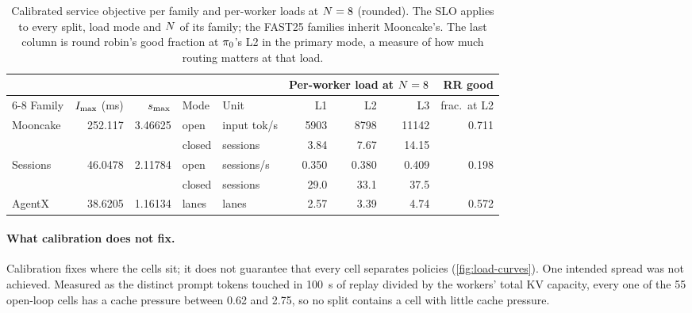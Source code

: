 \begin{table}[tbp]
  \centering\small
  \caption{Calibrated service objective per family and per-worker loads at $N = 8$ (rounded).
    The SLO applies to every split, load mode and $N$ of its family; the FAST25 families
    inherit Mooncake's. The last column is round robin's good fraction at $\pi_{0}$'s L2 in the
    primary mode, a measure of how much routing matters at that load.}
  \label{tab:calibration}
  \begin{tabular}{@{}lrrllrrrr@{}}
    \toprule
    & & & & & \multicolumn{3}{c}{Per-worker load at $N = 8$} & RR good \\
    \cmidrule(lr){6-8}
    Family & $I_{\max}$ (ms) & $s_{\max}$ & Mode & Unit & L1 & L2 & L3 & frac.\ at L2 \\
    \midrule
    Mooncake & 252.117 & 3.46625 & open   & input tok/s & \num{5903} & \num{8798} & \num{11142} & 0.711 \\
             &         &         & closed & sessions    & 3.84  & 7.67  & 14.15 & \\
    Sessions & 46.0478 & 2.11784 & open   & sessions/s  & 0.350 & 0.380 & 0.409 & 0.198 \\
             &         &         & closed & sessions    & 29.0  & 33.1  & 37.5  & \\
    AgentX   & 38.6205 & 1.16134 & lanes  & lanes       & 2.57  & 3.39  & 4.74  & 0.572 \\
    \bottomrule
  \end{tabular}
\end{table}

\paragraph{What calibration does not fix.}
Calibration fixes where the cells sit; it does not guarantee that every cell separates policies
(\cref{fig:load-curves}). One intended spread was not achieved. Measured as the distinct prompt
tokens touched in \SI{100}{s} of replay divided by the workers' total KV capacity, every one of
the 55 open-loop cells has a cache pressure between 0.62 and 2.75, so no split contains a cell
with little cache pressure.

